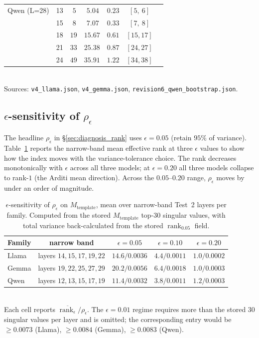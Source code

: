 \documentclass[10pt]{article}
\theoremstyle{definition}
\theoremstyle{remark}
\begin{document}
\begin{table}[h]
\begin{tabular}{@{}llccccc@{}}
\midrule
Qwen (L=28)  & 13 & $~5$ & $~5.04$ & $0.23$ & $[5,~6]$ \\
             & 15 & $~8$ & $~7.07$ & $0.33$ & $[7,~8]$ \\
             & 18 & $19$ & $15.67$ & $0.61$ & $[15, 17]$ \\
             & 21 & $33$ & $25.38$ & $0.87$ & $[24, 27]$ \\
             & 24 & $49$ & $35.91$ & $1.22$ & $[34, 38]$ \\
\bottomrule
\end{tabular}\\
\small Sources: \texttt{v4\_llama.json},
\texttt{v4\_gemma.json},
\texttt{revision6\_qwen\_bootstrap.json}.
\end{table}


\subsection{$\epsilon$-sensitivity of $\rho_{\epsilon}$}
\label{app:eps_sensitivity}

The headline $\rho_{\epsilon}$ in
\S\ref{sec:diagnosis_rank} uses $\epsilon=0.05$
(retain $95\%$ of variance).  Table~\ref{tab:eps_sens}
reports the narrow-band mean effective rank at three
$\epsilon$ values to show how the index moves with the
variance-tolerance choice.  The rank decreases
monotonically with $\epsilon$ across all three models;
at $\epsilon=0.20$ all three models collapse to
rank-$1$ (the Arditi mean direction).  Across the
$0.05$--$0.20$ range, $\rho_{\epsilon}$ moves by under
an order of magnitude.

\begin{table}[h]\centering
\caption{$\epsilon$-sensitivity of $\rho_{\epsilon}$ on
$M_{\mathrm{template}}$, mean over narrow-band Test~2
layers per family.  Computed from the stored
$M_{\mathrm{template}}$ top-$30$ singular values, with
total variance back-calculated from the stored
$\operatorname{rank}_{0.05}$ field.}
\label{tab:eps_sens}
\begin{tabular}{@{}lcccc@{}}
\toprule
Family & narrow band & $\epsilon=0.05$
  & $\epsilon=0.10$ & $\epsilon=0.20$ \\
\midrule
Llama  & layers $14,15,17,19,22$
  & $14.6/0.0036$ & $4.4/0.0011$ & $1.0/0.0002$ \\
Gemma  & layers $19,22,25,27,29$
  & $20.2/0.0056$ & $6.4/0.0018$ & $1.0/0.0003$ \\
Qwen   & layers $12,13,15,17,19$
  & $11.4/0.0032$ & $3.8/0.0011$ & $1.2/0.0003$ \\
\bottomrule
\end{tabular}\\
\small Each cell reports $\overline{\operatorname{rank}_{\epsilon}}/\rho_{\epsilon}$.
The $\epsilon=0.01$ regime requires more than the
stored $30$ singular values per layer and is omitted;
the corresponding entry would be $\geq 0.0073$
(Llama), $\geq 0.0084$ (Gemma), $\geq 0.0083$ (Qwen).
\end{table}
\end{document}
